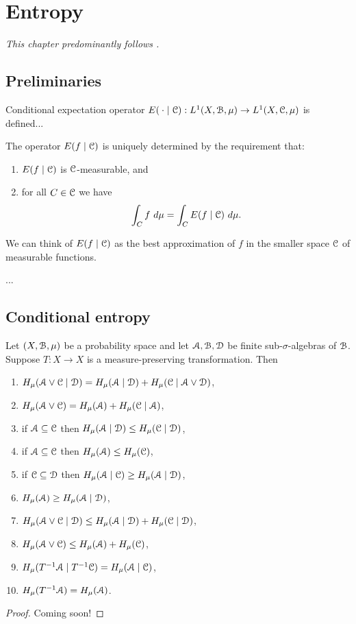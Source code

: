 \chapter{Entropy}
\emph{This chapter predominantly follows \cite[Chapter 4]{walters:intro-to-ergodic-theory}.}

\section{Preliminaries}
\begin{definition}
	Conditional expectation operator $E(\:\cdot \mid \mathcal{C}) : L^1(X, \mathcal{B}, \mu) \to L^1(X, \mathcal{C}, \mu)$ is defined...
\end{definition}

The operator $E(f \mid \mathcal{C})$ is uniquely determined by the requirement that:
\begin{enumerate}
	\item $E(f \mid \mathcal{C})$ is $\mathcal{C}$-measurable, and
	\item for all $C \in \mathcal{C}$ we have
	\[
	\int_C{f\ d\mu} = \int_C{E(f \mid \C)\ d\mu}.
	\]
\end{enumerate}

We can think of $E(f \mid \mathcal{C})$ as the best approximation of $f$ in the smaller space $\mathcal{C}$ of measurable functions.~\cite[Lecture 21]{ergodic-lectures}

...

\section{Conditional entropy}
\begin{theorem}\label{thm:walters-4.3}
	Let $(X, \mathcal{B}, \mu)$ be a probability space and let $\mathcal{A}, \mathcal{B}, \mathcal{D}$ be finite sub-$\sigma$-algebras of $\mathcal{B}$. Suppose $T : X \to X$ is a measure-preserving transformation. Then
	\begin{enumerate}
		\item $H_\mu(\mathcal{A} \vee \mathcal{C} \mid \mathcal{D}) = H_\mu(\mathcal{A} \mid \mathcal{D}) + H_\mu(\mathcal{C} \mid \mathcal{A} \vee \mathcal{D})$,
		\item $H_\mu(\mathcal{A} \vee \mathcal{C}) = H_\mu(\mathcal{A}) + H_\mu(\mathcal{C} \mid \mathcal{A})$,
		\item if $\mathcal{A} \subseteq \mathcal{C}$  then $H_\mu(\mathcal{A} \mid \mathcal{D}) \leq H_\mu(\mathcal{C} \mid \mathcal{D})$,
		\item if $\mathcal{A} \subseteq \mathcal{C}$  then $H_\mu(\mathcal{A}) \leq H_\mu(\mathcal{C})$,
		\item if $\mathcal{C} \subseteq \mathcal{D}$ then $H_\mu(\mathcal{A} \mid \mathcal{C}) \geq H_\mu(\mathcal{A} \mid \mathcal{D})$,
		\item $H_\mu(\mathcal{A}) \geq H_\mu(\mathcal{A} \mid \mathcal{D})$,
		\item $H_\mu(\mathcal{A} \vee \mathcal{C} \mid \mathcal{D}) \leq H_\mu(\mathcal{A} \mid \mathcal{D}) + H_\mu(\mathcal{C} \mid \mathcal{D})$,
		\item $H_\mu(\mathcal{A} \vee \mathcal{C}) \leq H_\mu(\mathcal{A}) + H_\mu(\mathcal{C})$,
		\item $H_\mu(T^{-1}\mathcal{A} \mid T^{-1}\mathcal{C}) = H_\mu(\mathcal{A} \mid \mathcal{C})$,
		\item $H_\mu(T^{-1}\mathcal{A}) = H_\mu(\mathcal{A})$.
	\end{enumerate}
	\begin{proof}
		Coming soon!
	\end{proof}
\end{theorem}

